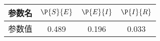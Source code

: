 \begin{tabular}{cccc}
\hline
参数名&$\P{S}{E}$&$\P{E}{I}$&$\P{I}{R}$\\
\hline
参数值&0.489&0.196&0.033\\
\hline
\end{tabular}